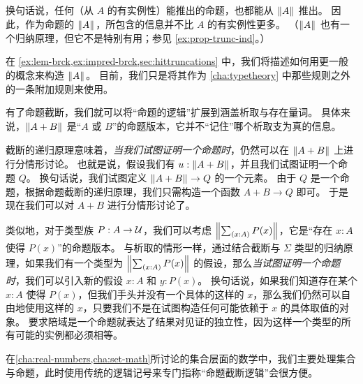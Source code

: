 换句话说，任何（从 $A$ 的有实例性）能推出的命题，也都能从 $\mathopen{}\left\Vert A\right\Vert_{}\mathclose{}$ 推出。
因此，作为命题的 $\mathopen{}\left\Vert A\right\Vert_{}\mathclose{}$，所包含的信息并不比 $A$ 的有实例性更多。
（$\mathopen{}\left\Vert A\right\Vert_{}\mathclose{}$ 也有一个归纳原理，但它不是特别有用；参见 \cref{ex:prop-trunc-ind}。）

在 \cref{ex:lem-brck,ex:impred-brck,sec:hittruncations} 中，我们将描述如何用更一般的概念来构造 $\mathopen{}\left\Vert A\right\Vert_{}\mathclose{}$。
目前，我们只是将其作为 \cref{cha:typetheory} 中那些规则之外的一条附加规则来使用。

有了命题截断，我们就可以将``命题的逻辑''扩展到涵盖析取与存在量词。
具体来说，$\mathopen{}\left\Vert A+B\right\Vert_{}\mathclose{}$ 是``$A$ 或 $B$''的命题版本，它并不``记住''哪个析取支为真的信息。

截断的递归原理意味着，\emph{当我们试图证明一个命题时}，仍然可以在 $\mathopen{}\left\Vert A+B\right\Vert_{}\mathclose{}$ 上进行分情形讨论。
也就是说，假设我们有 $u:\mathopen{}\left\Vert A+B\right\Vert_{}\mathclose{}$，并且我们试图证明一个命题 $Q$。
换句话说，我们试图定义 $\mathopen{}\left\Vert A+B\right\Vert_{}\mathclose{} \to Q$ 的一个元素。
由于 $Q$ 是一个命题，根据命题截断的递归原理，我们只需构造一个函数 $A+B\to Q$ 即可。
于是现在我们可以对 $A+B$ 进行分情形讨论了。

类似地，对于类型族 $P:A\to\mathcal{U}$，我们可以考虑 $\brck{\sm{x:A} P(x)}$，它是``存在 $x:A$ 使得 $P(x)$''的命题版本。
与析取的情形一样，通过结合截断与 $\Sigma$ 类型的归纳原理，如果我们有一个类型为 $\brck{\sm{x:A} P(x)}$ 的假设，那么\emph{当试图证明一个命题时}，我们可以引入新的假设 $x:A$ 和 $y:P(x)$。
换句话说，如果我们知道存在某个 $x:A$ 使得 $P(x)$，但我们手头并没有一个具体的这样的 $x$，那么我们仍然可以自由地使用这样的 $x$，只要我们不是在试图构造任何可能依赖于 $x$ 的具体取值的对象。
要求陪域是一个命题就表达了结果对见证的独立性，因为这样一个类型的所有可能的实例都必须相等。

在\cref{cha:real-numbers,cha:set-math}所讨论的集合层面的数学中，我们主要处理集合与命题，此时使用传统的逻辑记号来专门指称``命题截断逻辑''会很方便。

